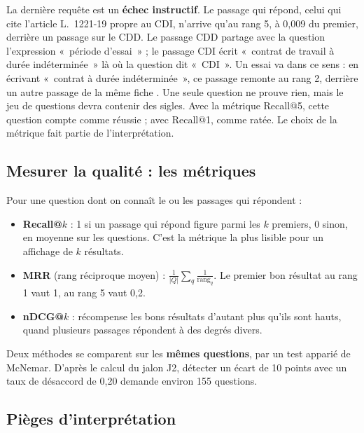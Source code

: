 La dernière requête est un \textbf{échec instructif}. Le passage qui répond, celui qui cite l'article L.~1221-19
propre au CDI, n'arrive qu'au rang 5, à 0,009 du premier, derrière un passage sur le CDD. Le passage CDD partage
avec la question l'expression «~période d'essai~» ; le passage CDI écrit «~contrat de travail à durée indéterminée~»
là où la question dit «~CDI~». Un essai va dans ce sens : en écrivant «~contrat à durée indéterminée~», ce passage
remonte au rang 2, derrière un autre passage de la même fiche \mesure. Une seule question ne prouve rien, mais le
jeu de questions devra contenir des sigles. Avec la métrique
Recall@5, cette question compte comme réussie ; avec Recall@1, comme ratée. Le choix de la métrique fait partie
de l'interprétation.

\subsection{Mesurer la qualité : les métriques}\label{sec:metriques}

Pour une question dont on connaît le ou les passages qui répondent :
\begin{itemize}
\item \textbf{Recall@}$k$ : 1 si un passage qui répond figure parmi les $k$ premiers, 0 sinon, en moyenne sur les
  questions. C'est la métrique la plus lisible pour un affichage de $k$ résultats.
\item \textbf{MRR} (rang réciproque moyen) : $\frac{1}{|Q|}\sum_{q} \frac{1}{\operatorname{rang}_q}$. Le premier bon
  résultat au rang 1 vaut 1, au rang 5 vaut 0,2.
\item \textbf{nDCG@}$k$ : récompense les bons résultats d'autant plus qu'ils sont hauts, quand plusieurs passages
  répondent à des degrés divers.
\end{itemize}
Deux méthodes se comparent sur les \textbf{mêmes questions}, par un test apparié de McNemar. D'après le calcul du
jalon J2, détecter un écart de 10 points avec un taux de désaccord de 0,20 demande environ 155 questions.

\subsection{Pièges d'interprétation}


